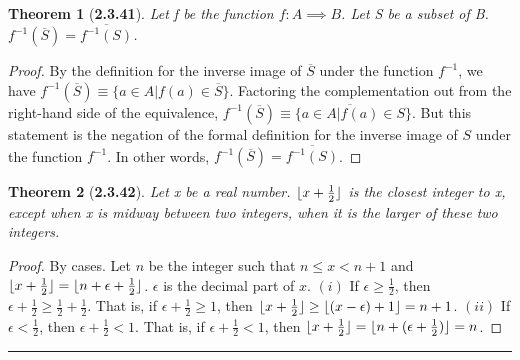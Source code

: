 \documentclass[a4paper, 12pt]{article}
\theoremstyle{plain}
\newtheorem*{theorem*}{Theorem}
\DeclarePairedDelimiter{\floor}{\lfloor}{\rfloor}
\begin{document}
\begin{theorem*}[\textbf{2.3.41}]
    Let f be the function $f: A \implies B$. Let S be a subset of B. 
    $f^{-1}(\overline{S}) = \overline{f^{-1}(S)}$.
\end{theorem*}

\begin{proof}
    By the definition for the inverse image of $\overline{S}$ under the function $f^{-1}$, 
    we have  $f^{-1}(\overline{S}) \equiv \{a \in A|f(a) \in \overline{S}\}$. Factoring the 
    complementation out from the right-hand side of the equivalence, 
    $f^{-1}(\overline{S}) \equiv \overline{\{a \in A | f(a) \in S}\}$. But this statement is the 
    negation of the formal definition for the inverse image of $S$ under the function $f^{-1}$. 
    In other words, $f^{-1}(\overline{S}) = \overline{f^{-1}(S)}$.
\end{proof}

\pagebreak


\begin{theorem*}[\textbf{2.3.42}]
    Let x be a real number. $\floor{x + \frac{1}{2}}$ is the closest integer to x, except when 
    x is midway between two integers, when it is the larger of these two integers.
\end{theorem*}

\begin{proof}
    By cases. Let $n$ be the integer such that $n \le x < n+1$ and \newline 
    $\floor{x + \frac{1}{2}} = \floor{n + \epsilon + \frac{1}{2}}$. $\epsilon$ is the decimal 
    part of $x$. \newline \newline $(i)$ If $\epsilon \ge \frac{1}{2}$, then 
    $\epsilon + \frac{1}{2} \ge \frac{1}{2} + \frac{1}{2}$. That is, if 
    $\epsilon + \frac{1}{2} \ge 1$, then \newline  
    $\floor{x + \frac{1}{2}} \ge \floor {(x - \epsilon) + 1} = n + 1$.
    \newline \newline $(ii)$ If $\epsilon < \frac{1}{2}$, then $\epsilon + \frac{1}{2} < 1$. 
    That is, if $\epsilon + \frac{1}{2} < 1$, then \newline 
    $\floor{x + \frac{1}{2}} = \floor{n + (\epsilon + \frac{1}{2})} = n$.
\end{proof}
\begin{center}
    \rule{5.4in}{1pt}
\end{center}
\end{document}
